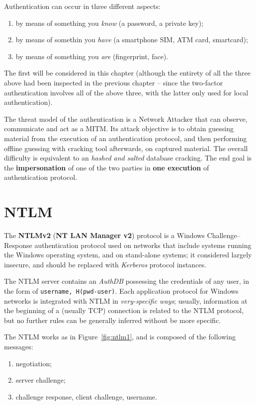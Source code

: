 \documentclass[10pt]{extbook}
\begin{document}
Authentication can occur in three different aspects:
\begin{enumerate}
    \item by means of something you \emph{know} (a password, a private key);
    \item by means of somethin you \emph{have} (a smartphone SIM, ATM card,
        smartcard);
    \item by means of something you \emph{are} (fingerprint, face).
\end{enumerate}

The first will be considered in this chapter (although the entirety of all the
three above had been inspected in the previous chapter -- since the
two\--factor authentication involves all of the above three, with the latter
only used for local authentication).

The threat model of the authentication is a Network Attacker that can observe,
communicate and act as a MITM. Its attack objective is to obtain guessing
material from the execution of an authentication protocol, and then performing
offline guessing with cracking tool afterwards, on captured material. The
overall difficulty is equivalent to an \emph{hashed and salted} database
cracking. The end goal is the \textbf{impersonation} of one of the two parties
in \textbf{one execution} of authentication protocol.

\section{NTLM}

The \textbf{NTLMv2} (\textbf{NT LAN Manager v2}) protocol is a Windows
Challenge\---Response authentication protocol used on networks that include
systems running the Windows operating system, and on stand\--alone systems; it
considered largely insecure, and should be replaced with \emph{Kerberos}
protocol instances.

The NTLM server contains an \emph{AuthDB} possessing the credentials of any
user, in the form of \texttt{username, H(pwd-user)}. Each application protocol
for Windows networks is integrated with NTLM in \emph{very\--specific ways};
usually, information at the beginning of a (usually TCP) connection is related
to the NTLM protocol, but no further rules can be generally inferred without be
more specific.

The NTLM works as in Figure~\ref{fig:ntlm1}, and is composed of the following
messages:
\begin{enumerate}
    \item negotiation;
    \item server challenge;
    \item challenge response, client challenge, username.
\end{enumerate}
\end{document}
